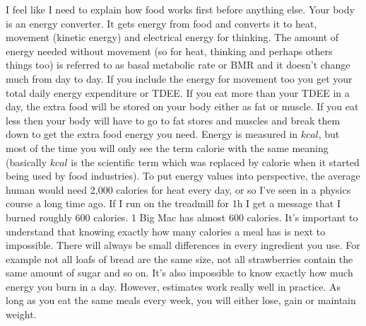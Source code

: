 \documentclass[openany, 12pt]{book}
\begin{document}
	I feel like I need to explain how food works first before anything else. Your body is an energy converter. It gets energy from food
        and converts it to heat, movement (kinetic energy) and 
	electrical energy for thinking. The amount of energy needed without movement (so for heat, thinking and perhaps others things too) is referred 
	to as basal metabolic rate or BMR and it
	doesn't change much from day to day. If you include the energy for movement too you get your total daily energy expenditure or TDEE. If you eat
	more than your TDEE in a day, the extra food will be stored on your body either as fat or muscle. If you eat less then your body will have to go
	to fat stores and muscles and break them down to get the extra food energy you need. Energy is measured in $kcal$, but most of the time you will
	only see the term calorie with the same meaning (basically $kcal$ is the scientific term which was replaced by calorie when it started being used
	by food industries). To put energy values into perspective, the average human would need 2,000 calories for heat every day, or so I've seen in a
	physics course a long time ago. If I run on the treadmill for 1h I get a message that I burned roughly 600 calories. 1 Big Mac has almost 600 calories.
        It's important to understand that knowing exactly how many calories a meal has is next to impossible. There will always be small differences in every
        ingredient you use. For example not all loafs of bread are the same size, not all strawberries contain the same amount of sugar and so on. It's also
        impossible to know exactly how much energy you burn in a day. However, estimates work really well in practice. As long as you eat the same meals every week,
        you will either lose, gain or maintain weight.
	
\end{document}
